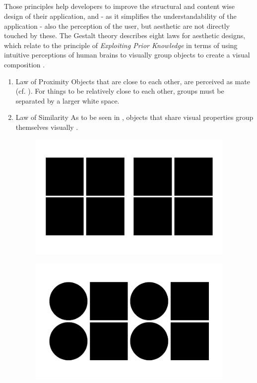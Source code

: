 \subparagraph*{} Those principles help developers to improve the structural and content wise design of their application, and - as it simplifies the understandability of the application - also the perception of the user, but aesthetic are not directly touched by these. The Gestalt theory describes eight laws for aesthetic designs, which relate to the principle of \textit{Exploiting Prior Knowledge} in terms of using intuitive perceptions of human brains to visually group objects to create a visual composition \parencite[cf.][113]{Sternberg.2012}.
\begin{enumerate}
    \item{Law of Proximity} Objects that are close to each other, are perceived as mate (cf. ). For things to be relatively close to each other, groups must be separated by a larger white space. \parencite{Seogaard.n.y.}
    \item{Law of Similarity} As to be seen in , objects that share visual properties group themselves visually \parencite[cf.][2]{Bakar.2017}.
    \begin{figure}[H] 
        \begin{minipage}[b]{.5\linewidth}
            \centering\includegraphics[width=0.94\textwidth]{img/proximity.pdf}
            \label{fig:prox}
        \end{minipage}%
        \begin{minipage}[b]{.5\linewidth}
            \centering\includegraphics[width=0.94\textwidth]{img/similarity.pdf}

\end{minipage}
\end{figure}
\end{enumerate}

